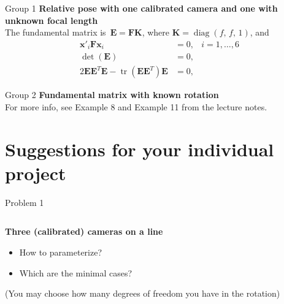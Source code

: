 \documentclass[aspectratio=169]{beamer}
\newcommand{\mat}[1]{\bm{#1}}
\DeclareMathOperator{\tr}{tr}
\DeclareMathOperator{\diag}{diag}
\newcommand{\T}{T}
\begin{document}
\begin{frame}{Group 1}
\textbf{Relative pose with one calibrated camera and one with unknown focal length}\\[8mm]
The fundamental matrix is~$\mat{E=FK}$, where $\mat{K}=\diag(f,\,f,\,1)$, and
\begin{equation*}
\begin{aligned}
    \mat{x}'_i\mat{F}\mat{x}_i &= 0, &i=1,\ldots,6\\
    \det(\mat{E}) &= 0, &\\
    2\mat{EE}^\T\mat{E}- \tr(\mat{EE}^\T)\mat{E} &= 0, &
\end{aligned}
\end{equation*}
\end{frame}

\begin{frame}{Group 2}
\textbf{Fundamental matrix with known rotation}\\[8mm]
For more info, see Example 8 and Example 11 from the lecture notes.
\end{frame}


\section{Suggestions for your individual project}

\begin{frame}{Problem 1}
\begin{columns}
    \begin{column}{0.5\textwidth}
        \textbf{Three (calibrated) cameras on a line}\\[8mm]
        \begin{itemize}
            \item How to parameterize?
            \item Which are the minimal cases?
        \end{itemize}
    \vspace{8mm}
    \footnotesize{(You may choose how many degrees of freedom you have in the rotation)}
    \end{column}%
    \begin{column}{0.5\textwidth}
        \centering
        
    \end{column}
\end{columns}
\end{frame}
\end{document}
